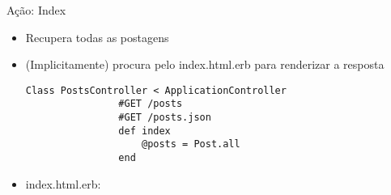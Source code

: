 \begin{frame}{Ação: Index}
	\begin{itemize}
		\item Recupera todas as postagens 
		\item (Implicitamente) procura pelo \alert{index.html.erb} para renderizar a resposta
		\begin{lstlisting}[style=RubyInputStyle, caption=posts_controller.rb]
			Class PostsController < ApplicationController
				#GET /posts
				#GET /posts.json 
				def index 
					@posts = Post.all
				end 
		\end{lstlisting}		
		
		\item \alert{index.html.erb}:
		
				
	\end{itemize}	
\end{frame}